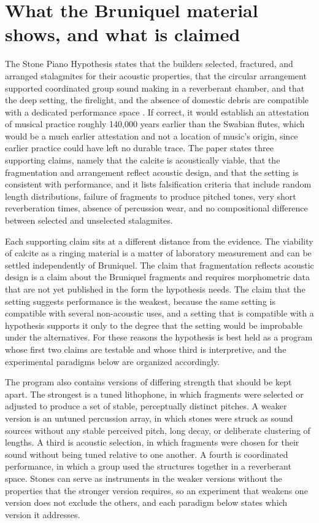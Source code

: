 \documentclass[12pt]{article}
\begin{document}
\section{What the Bruniquel material shows, and what is claimed}

The Stone Piano Hypothesis states that the builders selected, fractured, and arranged stalagmites for their acoustic properties, that the circular arrangement supported coordinated group sound making in a reverberant chamber, and that the deep setting, the firelight, and the absence of domestic debris are compatible with a dedicated performance space \cite{stonepiano}. If correct, it would establish an attestation of musical practice roughly 140,000 years earlier than the Swabian flutes, which would be a much earlier attestation and not a location of music's origin, since earlier practice could have left no durable trace. The paper states three supporting claims, namely that the calcite is acoustically viable, that the fragmentation and arrangement reflect acoustic design, and that the setting is consistent with performance, and it lists falsification criteria that include random length distributions, failure of fragments to produce pitched tones, very short reverberation times, absence of percussion wear, and no compositional difference between selected and unselected stalagmites.

Each supporting claim sits at a different distance from the evidence. The viability of calcite as a ringing material is a matter of laboratory measurement and can be settled independently of Bruniquel. The claim that fragmentation reflects acoustic design is a claim about the Bruniquel fragments and requires morphometric data that are not yet published in the form the hypothesis needs. The claim that the setting suggests performance is the weakest, because the same setting is compatible with several non-acoustic uses, and a setting that is compatible with a hypothesis supports it only to the degree that the setting would be improbable under the alternatives. For these reasons the hypothesis is best held as a program whose first two claims are testable and whose third is interpretive, and the experimental paradigms below are organized accordingly.

The program also contains versions of differing strength that should be kept apart. The strongest is a tuned lithophone, in which fragments were selected or adjusted to produce a set of stable, perceptually distinct pitches. A weaker version is an untuned percussion array, in which stones were struck as sound sources without any stable perceived pitch, long decay, or deliberate clustering of lengths. A third is acoustic selection, in which fragments were chosen for their sound without being tuned relative to one another. A fourth is coordinated performance, in which a group used the structures together in a reverberant space. Stones can serve as instruments in the weaker versions without the properties that the stronger version requires, so an experiment that weakens one version does not exclude the others, and each paradigm below states which version it addresses.
\end{document}
